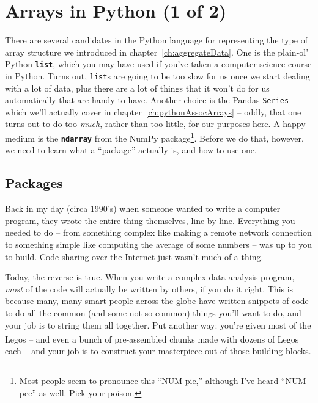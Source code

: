 


\chapter{Arrays in Python (1 of 2)}

There are several candidates in the Python language for representing the type
of array structure we introduced in chapter~\ref{ch:aggregateData}. One is the
plain-ol' Python \textbf{\texttt{list}}, which you may have used if you've
taken a computer science course in Python. Turns out, \texttt{list}s are going
to be too slow for us once we start dealing with a lot of data, plus there are
a lot of things that it won't do for us automatically that are handy to have.
Another choice is the Pandas \texttt{Series} which we'll actually cover in
chapter~\ref{ch:pythonAssocArrays} -- oddly, that one turns out to do too
\textit{much}, rather than too little, for our purposes here. A happy medium is
the \textbf{\texttt{ndarray}} from the NumPy package\footnote{Most people seem
to pronounce this ``NUM-pie,'' although I've heard ``NUM-pee'' as well. Pick
your poison.}. Before we do that, however, we need to learn what a ``package''
actually is, and how to use one.

\section{Packages}

Back in my day (circa 1990's) when someone wanted to write a computer program,
they wrote the entire thing themselves, line by line. Everything you needed to
do -- from something complex like making a remote network connection to
something simple like computing the average of some numbers -- was up to you to
build. Code sharing over the Internet just wasn't much of a thing.

Today, the reverse is true. When you write a complex data analysis program,
\textit{most} of the code will actually be written by others, if you do it
right. This is because many, many smart people across the globe have written
snippets of code to do all the common (and some not-so-common) things you'll
want to do, and your job is to string them all together. Put another way:
you're given most of the Legos\textsuperscript{\textregistered} -- and even a
bunch of pre-assembled chunks made with dozens of
Legos\textsuperscript{\textregistered} each -- and your job is to construct
your masterpiece out of those building blocks.

